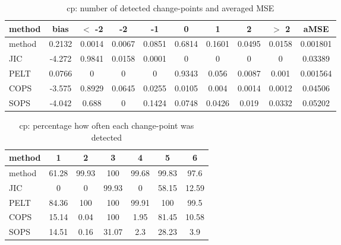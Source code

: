 \begin{table}[ht]
\centering
\begin{tabular}{l|c|ccccccc|c}
  \hline
method & bias & $<$ -2 & -2 & -1 & 0 & 1 & 2 & $>$ 2 & aMSE \\ 
  \hline
method & 0.2132 & 0.0014 & 0.0067 & 0.0851 & 0.6814 & 0.1601 & 0.0495 & 0.0158 & 0.001801 \\ 
  JIC & -4.272 & 0.9841 & 0.0158 & 0.0001 &     0 &     0 &     0 &     0 & 0.03389 \\ 
  PELT & 0.0766 &     0 &     0 &     0 & 0.9343 & 0.056 & 0.0087 & 0.001 & 0.001564 \\ 
  COPS & -3.575 & 0.8929 & 0.0645 & 0.0255 & 0.0105 & 0.004 & 0.0014 & 0.0012 & 0.04506 \\ 
  SOPS & -4.042 & 0.688 &     0 & 0.1424 & 0.0748 & 0.0426 & 0.019 & 0.0332 & 0.05202 \\ 
   \hline
\end{tabular}
\caption{cp: number of detected change-points and averaged MSE} 
\label{tab:cpNjumps}
\end{table}
\begin{table}[ht]
\centering
\begin{tabular}{l|cccccc}
  \hline
method & 1 & 2 & 3 & 4 & 5 & 6 \\ 
  \hline
method &  61.28 &  99.93 &    100 &  99.68 &  99.83 &   97.6 \\ 
  JIC &      0 &      0 &  99.93 &      0 &  58.15 &  12.59 \\ 
  PELT &  84.36 &    100 &    100 &  99.91 &    100 &   99.5 \\ 
  COPS &  15.14 &   0.04 &    100 &   1.95 &  81.45 &  10.58 \\ 
  SOPS &  14.51 &   0.16 &  31.07 &    2.3 &  28.23 &    3.9 \\ 
   \hline
\end{tabular}
\caption{cp: percentage how often each change-point was detected} 
\label{tab:cpDetections}
\end{table}
